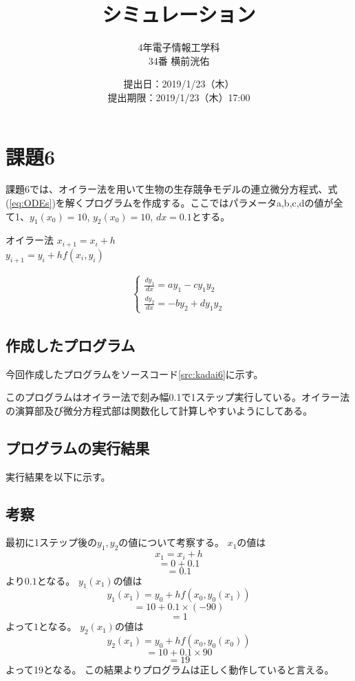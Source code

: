 \documentclass[11pt,titlepage]{jsarticle}
\title{シミュレーション}
\author{4年電子情報工学科\\34番 横前洸佑}
\date{提出日：2019/1/23（木）\\	提出期限：2019/1/23（木）17:00}
\begin{document}
\maketitle

\section{課題6}
課題6では、オイラー法を用いて生物の生存競争モデルの連立微分方程式、式(\ref{eq:ODEs})を解くプログラムを作成する。ここではパラメータa,b,c,dの値が全て1、$y_1(x_0)=10$, $y_2(x_0)=10$, $dx=0.1$とする。

\begin{itembox}[l]{オイラー法}
\centering
	$x_{i+1}=x_i+h$ \\
	$y_{i+1}=y_i+hf(x_i,y_i)$ 
\end{itembox}

\begin{eqnarray}
\label{eq:ODEs}
	\left\{
		\begin{array}{l}
			\frac{dy_1}{dx}=ay_1-cy_1y_2 \\
			\frac{dy_2}{dx}=-by_2+dy_1y_2
		\end{array}
	\right.
\end{eqnarray}

\subsection{作成したプログラム}
今回作成したプログラムをソースコード\ref{src:kadai6}に示す。


このプログラムはオイラー法で刻み幅0.1で1ステップ実行している。オイラー法の演算部及び微分方程式部は関数化して計算しやすいようにしてある。

\subsection{プログラムの実行結果}
実行結果を以下に示す。
\begin{oframed}
\end{oframed}

\subsection{考察}
最初に1ステップ後の$y_1, y_2$の値について考察する。
$x_1$の値は
\[x_{1}=x_i+h\]
\[=0+0.1\]
\[=0.1\]
より$0.1$となる。
\newpage
$y_1(x_1)$の値は
\[y_1(x_1)=y_0+hf(x_0,y_0(x_1))\]
\[=10+0.1\times(-90)\]
\[=1\]
よって$1$となる。
$y_2(x_1)$の値は
\[y_2(x_1)=y_0+hf(x_0,y_0(x_0))\]
\[=10+0.1\times 90\]
\[=19\]
よって19となる。
この結果よりプログラムは正しく動作していると言える。
\end{document}
